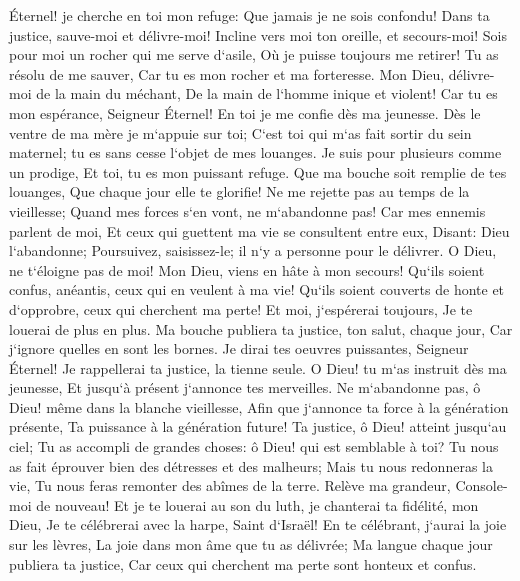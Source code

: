 \verse Éternel! je cherche en toi mon refuge: Que jamais je ne sois confondu! 
\verse Dans ta justice, sauve-moi et délivre-moi! Incline vers moi ton oreille, et secours-moi! 
\verse Sois pour moi un rocher qui me serve d`asile, Où je puisse toujours me retirer! Tu as résolu de me sauver, Car tu es mon rocher et ma forteresse. 
\verse Mon Dieu, délivre-moi de la main du méchant, De la main de l`homme inique et violent! 
\verse Car tu es mon espérance, Seigneur Éternel! En toi je me confie dès ma jeunesse. 
\verse Dès le ventre de ma mère je m`appuie sur toi; C`est toi qui m`as fait sortir du sein maternel; tu es sans cesse l`objet de mes louanges. 
\verse Je suis pour plusieurs comme un prodige, Et toi, tu es mon puissant refuge. 
\verse Que ma bouche soit remplie de tes louanges, Que chaque jour elle te glorifie! 
\verse Ne me rejette pas au temps de la vieillesse; Quand mes forces s`en vont, ne m`abandonne pas! 
\verse Car mes ennemis parlent de moi, Et ceux qui guettent ma vie se consultent entre eux, 
\verse Disant: Dieu l`abandonne; Poursuivez, saisissez-le; il n`y a personne pour le délivrer. 
\verse O Dieu, ne t`éloigne pas de moi! Mon Dieu, viens en hâte à mon secours! 
\verse Qu`ils soient confus, anéantis, ceux qui en veulent à ma vie! Qu`ils soient couverts de honte et d`opprobre, ceux qui cherchent ma perte! 
\verse Et moi, j`espérerai toujours, Je te louerai de plus en plus. 
\verse Ma bouche publiera ta justice, ton salut, chaque jour, Car j`ignore quelles en sont les bornes. 
\verse Je dirai tes oeuvres puissantes, Seigneur Éternel! Je rappellerai ta justice, la tienne seule. 
\verse O Dieu! tu m`as instruit dès ma jeunesse, Et jusqu`à présent j`annonce tes merveilles. 
\verse Ne m`abandonne pas, ô Dieu! même dans la blanche vieillesse, Afin que j`annonce ta force à la génération présente, Ta puissance à la génération future! 
\verse Ta justice, ô Dieu! atteint jusqu`au ciel; Tu as accompli de grandes choses: ô Dieu! qui est semblable à toi? 
\verse Tu nous as fait éprouver bien des détresses et des malheurs; Mais tu nous redonneras la vie, Tu nous feras remonter des abîmes de la terre. 
\verse Relève ma grandeur, Console-moi de nouveau! 
\verse Et je te louerai au son du luth, je chanterai ta fidélité, mon Dieu, Je te célébrerai avec la harpe, Saint d`Israël! 
\verse En te célébrant, j`aurai la joie sur les lèvres, La joie dans mon âme que tu as délivrée; 
\verse Ma langue chaque jour publiera ta justice, Car ceux qui cherchent ma perte sont honteux et confus. 

\chapter{}

